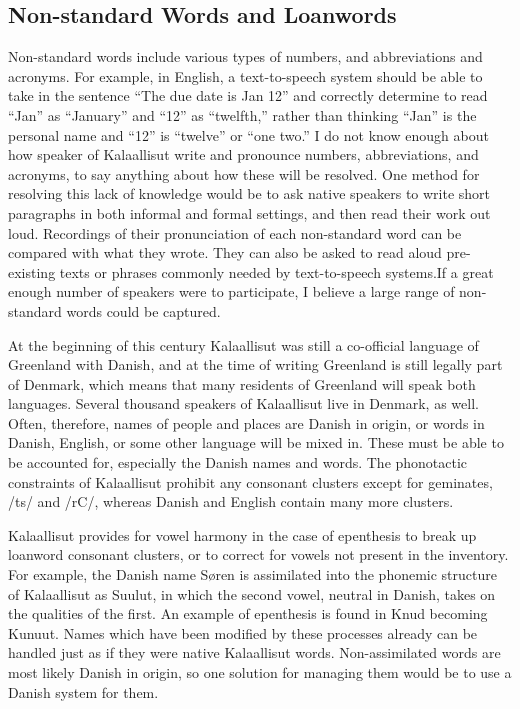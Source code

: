 \documentclass[12pt]{article}
\begin{document}
	\subsection{Non-standard Words and Loanwords}

	Non-standard words include various types of numbers, and abbreviations and acronyms. For example, in English, a text-to-speech system should be able to take in the sentence ``The due date is Jan 12'' and correctly determine to read ``Jan'' as ``January'' and ``12'' as ``twelfth,'' rather than thinking ``Jan'' is the personal name and ``12'' is ``twelve'' or ``one two.'' I do not know enough about how speaker of Kalaallisut write and pronounce numbers, abbreviations, and acronyms, to say anything about how these will be resolved. One method for resolving this lack of knowledge would be to ask native speakers to write short paragraphs in both informal and formal settings, and then read their work out loud. Recordings of their pronunciation of each non-standard word can be compared with what they wrote. They can also be asked to read aloud pre-existing texts or phrases commonly needed by text-to-speech systems.If a great enough number of speakers were to participate, I believe a large range of non-standard words could be captured. \par

	At the beginning of this century Kalaallisut was still a co-official language of Greenland with Danish, and at the time of writing Greenland is still legally part of Denmark, which means that many residents of Greenland will speak both languages. Several thousand speakers of Kalaallisut live in Denmark, as well. Often, therefore, names of people and places are Danish in origin, or words in Danish, English, or some other language will be mixed in. These must be able to be accounted for, especially the Danish names and words. The phonotactic constraints of Kalaallisut prohibit any consonant clusters except for geminates, /ts/ and /rC/, whereas Danish and English contain many more clusters. \par

	Kalaallisut provides for vowel harmony in the case of epenthesis to break up loanword consonant clusters, or to correct for vowels not present in the inventory. For example, the Danish name S\o ren is assimilated into the phonemic structure of Kalaallisut as Suulut, in which the second vowel, neutral in Danish, takes on the qualities of the first. An example of epenthesis is found in Knud becoming Kunuut. Names which have been modified by these processes already can be handled just as if they were native Kalaallisut words. Non-assimilated words are most likely Danish in origin, so one solution for managing them would be to use a Danish system for them. \par
\end{document}
